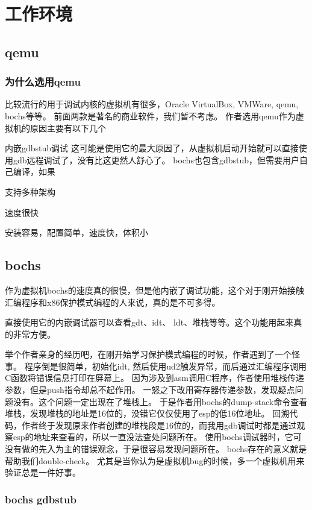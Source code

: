 \chapter{工作环境}

\section{qemu}
\subsection{为什么选用qemu}
比较流行的用于调试内核的虚拟机有很多，Oracle VirtualBox, VMWare, qemu, bochs等等。
前面两款是著名的商业软件，我们暂不考虑。 
作者选用qemu作为虚拟机的原因主要有以下几个
\begin{compactenum}
  \item 内嵌gdbstub调试 这可能是使用它的最大原因了，从虚拟机启动开始就可以直接使用gdb远程调试了，没有比这更然人舒心了。
bochs也包含gdbstub，但需要用户自己编译，如果
  \item 支持多种架构
  \item 速度很快
  \item 安装容易，配置简单，速度快，体积小
\end{compactenum}

\section{bochs}
作为虚拟机bochs的速度真的很慢，但是他内嵌了调试功能，这个对于刚开始接触汇编程序和x86保护模式编程的人来说，真的是不可多得。

直接使用它的内嵌调试器可以查看gdt、idt、 ldt、堆栈等等。这个功能用起来真的非常方便。

举个作者亲身的经历吧，在刚开始学习保护模式编程的时候，作者遇到了一个怪事。
程序倒是很简单，初始化idt, 然后使用ud2触发异常，而后通过汇编程序调用C函数将错误信息打印在屏幕上。
因为涉及到asm调用C程序，作者使用堆栈传递参数，但是push指令却总不起作用。
一怒之下改用寄存器传递参数，发现疑点问题没有。这个问题一定出现在了堆栈上。
于是作者用bochs的dump-stack命令查看堆栈，发现堆栈的地址是16位的，没错它仅仅使用了esp的低16位地址。
回溯代码，作者终于发现原来作者创建的堆栈段是16位的，而我用gdb调试时都是通过观察esp的地址来查看的，所以一直没法查处问题所在。
使用bochs调试器时，它可没有做的先入为主的错误观念，于是很容易发现问题所在。
bochs存在的意义就是帮助我们double-check。
尤其是当你认为是虚拟机bug的时候，多一个虚拟机用来验证总是一件好事。

\subsection{bochs gdbstub}

